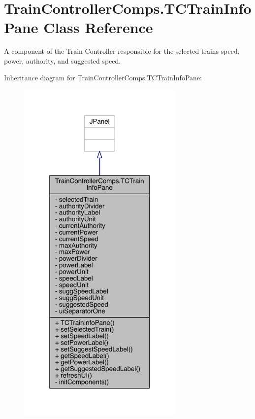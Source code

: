 \hypertarget{classTrainControllerComps_1_1TCTrainInfoPane}{}\section{Train\+Controller\+Comps.\+T\+C\+Train\+Info\+Pane Class Reference}
\label{classTrainControllerComps_1_1TCTrainInfoPane}


A component of the Train Controller responsible for the selected train\textquotesingle{}s speed, power, authority, and suggested speed.  




Inheritance diagram for Train\+Controller\+Comps.\+T\+C\+Train\+Info\+Pane\+:
\nopagebreak
\begin{figure}[H]
\begin{center}
\leavevmode
\includegraphics[width=232pt]{classTrainControllerComps_1_1TCTrainInfoPane__inherit__graph}
\end{center}
\end{figure}


